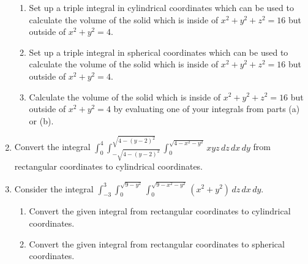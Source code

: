 \documentclass[12pt]{article}
\newif\ifans
\begin{document}
\begin{enumerate}
\begin{enumerate}

\item Set up a triple integral in cylindrical coordinates which can be used to calculate the volume of the solid which is inside of $x^2+y^2+z^2=16$ but outside of $x^2+y^2=4$.

\ifans{\fbox{$V=\int_0^{2\pi} \int_2^4 \int_{-\sqrt{16-r^2}}^{\sqrt{16-r^2}} r \,dz\,dr\,d\theta$}} \fi

\item Set up a triple integral in spherical coordinates which can be used to calculate the volume of the solid which is inside of $x^2+y^2+z^2=16$ but outside of $x^2+y^2=4$.

\ifans{\fbox{$V=\int_0^{2\pi} \int_{\pi/6}^{5\pi/6} \int_{2\csc{\phi}}^4 \rho^2\sin{\phi} \,d\rho\,d\phi\,d\theta$}} \fi

\item Calculate the volume of the solid which is inside of $x^2+y^2+z^2=16$ but outside of $x^2+y^2=4$ by evaluating one of your integrals from parts (a) or (b).

\ifans{\fbox{$32\pi\sqrt{3}$}} \fi

\end{enumerate}

\item Convert the integral $\int_0^4 \int_{-\sqrt{4-(y-2)^2}}^{\sqrt{4-(y-2)^2}} \int_0^{\sqrt{4-x^2-y^2}} xyz \,dz\,dx\,dy$ from rectangular coordinates to cylindrical coordinates.

\ifans{\fbox{$\int_0^\pi \int_0^{4\sin{\theta}} \int_0^{\sqrt{4-r^2}} r^3z\cos{\theta}\sin{\theta} \,dz\,dr\,d\theta$}} \fi

\item Consider the integral $\int_{-3}^3 \int_0^{\sqrt{9-y^2}} \int_0^{\sqrt{9-x^2-y^2}} (x^2+y^2) \,dz\,dx\,dy$.

\begin{enumerate}

\item Convert the given integral from rectangular coordinates to cylindrical coordinates.

\ifans{\fbox{$\int_{-\pi/2}^{\pi/2} \int_0^3 \int_0^{\sqrt{9-r^2}} r^3 \,dz\,dr\,d\theta$}} \fi

\item Convert the given integral from rectangular coordinates to spherical coordinates.

\ifans{\fbox{$\int_0^{\pi/2} \int_{-\pi/2}^{\pi/2} \int_0^3 \rho^4\sin^3{\phi}\,d\rho\,d\theta\,d\phi$}} \fi

\end{enumerate}

\end{enumerate}
\end{document}
